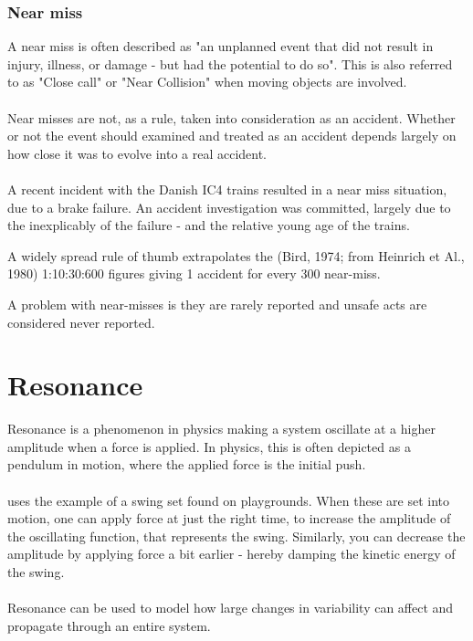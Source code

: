 \subsubsection*{Near miss}
\label{sec:near_miss}
A near miss is often described as "an unplanned event that did not result in injury, illness, or damage - but had the potential to do so". This is also referred to as "Close call" or "Near Collision" when moving objects are involved.\\
\\
Near misses are not, as a rule, taken into consideration as an accident. Whether or not the event should examined and treated as an accident depends largely on how close it was to evolve into a real accident.\\
\\
A recent incident with the Danish IC4 trains resulted in a near miss situation, due to a brake failure. An accident investigation was committed, largely due to the inexplicably of the failure - and the relative young age of the trains.

A widely spread rule of thumb extrapolates the (Bird, 1974; from Heinrich et Al., 1980) 1:10:30:600 figures giving 1 accident for every 300 near-miss.

A problem with near-misses is they are rarely reported and unsafe acts are considered never reported.

\section{Resonance}

Resonance is a phenomenon in physics making a system oscillate at a higher amplitude when a force is applied. In physics, this is often depicted as a pendulum in motion, where the applied force is the initial push.\\
\\
\cite{hollnagel2004barriers} uses the example of a swing set found on playgrounds. When these are set into motion, one can apply force at just the right time, to increase the amplitude of the oscillating function, that represents the swing. Similarly, you can decrease the amplitude by applying force a bit earlier - hereby damping the kinetic energy of the swing.\\
\\
Resonance can be used to model how large changes in variability can affect and propagate through an entire system. 

